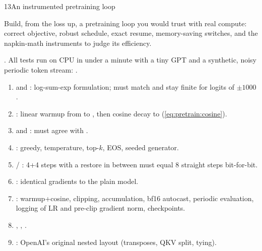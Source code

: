 \begin{labbox}{13}{An instrumented pretraining loop}

Build, from the loss up, a pretraining loop you would trust with real compute: correct
objective, robust schedule, exact resume, memory-saving switches, and the napkin-math
instruments to judge its efficiency.

. All tests run on CPU in under a minute
with a tiny GPT and a synthetic, noisy periodic token stream:
.

\begin{enumerate}
\item {} and : log-sum-exp formulation; must
  match  and stay finite for logits of $\pm1000$.
\item {}: linear warmup from  to , then
  cosine decay to  (\cref{eq:pretrain:cosine}).
\item {} and : must agree with
  .
\item {}: greedy, temperature, top-$k$, EOS, seeded generator.
\item {} / : 4+4 steps with a restore in between
  must equal 8 straight steps bit-for-bit.
\item {}: identical gradients to the plain model.
\item {}: warmup+cosine, clipping, accumulation, bf16 autocast, periodic
  evaluation, logging of LR and pre-clip gradient norm, checkpoints.
\item {}, , .
\item {}: OpenAI's original nested layout (transposes, QKV split,
  tying).
\end{enumerate}


\end{labbox}
